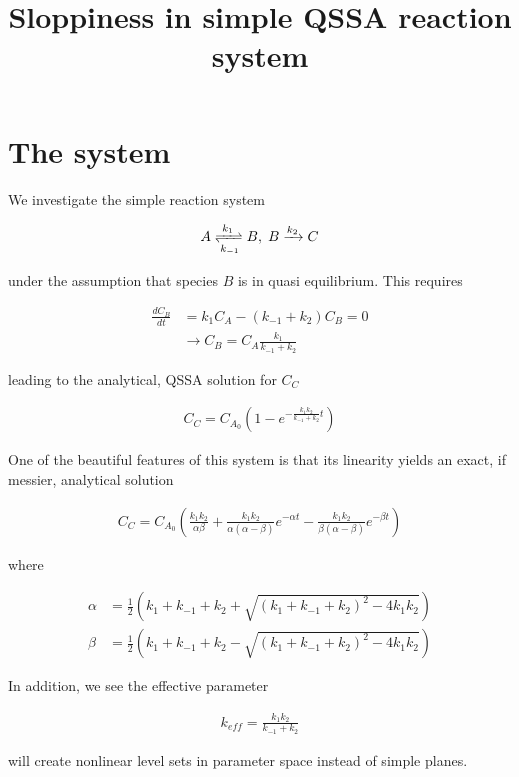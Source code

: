 \documentclass[11pt]{article}
\title{Sloppiness in simple QSSA reaction system}
\date{}
\begin{document}
\maketitle

\section{The system}

We investigate the simple reaction system

\begin{align*}
  A \xrightleftharpoons[k_{-1}]{k_1} B, \; B \xrightarrow[]{k_2} C
\end{align*}

under the assumption that species $B$ is in quasi equilibrium. This requires

\begin{align*}
  \frac{dC_B}{dt} &= k_1 C_A - (k_{-1} + k_2) C_B = 0 \\
  &\rightarrow C_B = C_A \frac{k_1}{k_{-1} + k_2}
\end{align*}

leading to the analytical, QSSA solution for $C_C$

\begin{align*}
  C_C = C_{A_0}(1 - e^{-\frac{k_1 k_2}{k_{-1} + k_2} t})
\end{align*}

One of the beautiful features of this system is that its linearity yields an exact, if messier, analytical solution

\begin{align*}
  C_C = C_{A_0}(\frac{k_1 k_2}{\alpha \beta} + \frac{k_1 k_2}{\alpha(\alpha - \beta)} e^{-\alpha t} - \frac{k_1 k_2}{\beta(\alpha - \beta)} e^{-\beta t})
\end{align*}

where

\begin{align*}
  \alpha &= \frac{1}{2}(k_1 + k_{-1} + k_2 + \sqrt{(k_1 + k_{-1} + k_2)^2 - 4 k_1 k_2}) \\
  \beta &=  \frac{1}{2}(k_1 + k_{-1} + k_2 - \sqrt{(k_1 + k_{-1} + k_2)^2 - 4 k_1 k_2})
\end{align*}

In addition, we see the effective parameter

\begin{align*}
  k_{eff} = \frac{k_1 k_2}{k_{-1} + k_2}
\end{align*}

will create nonlinear level sets in parameter space instead of simple planes.
\end{document}
